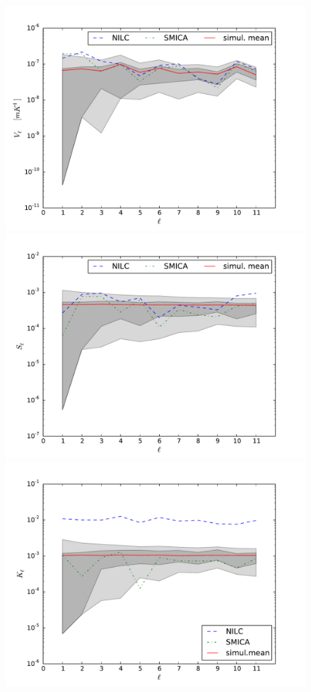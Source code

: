 \begin{figure}
\centering
\includegraphics[scale=0.3]{figures/chapter-vsk/Inp_Vl.pdf}
\includegraphics[scale=0.3]{figures/chapter-vsk/Inp_Sl.pdf}\\
\includegraphics[scale=0.3]{figures/chapter-vsk/Inp_Kl.pdf}

\end{figure}
